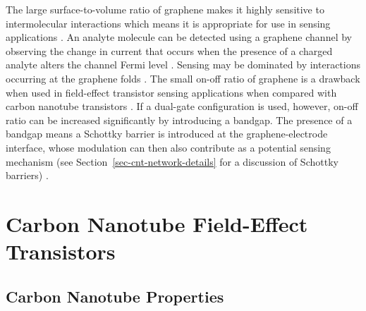 \documentclass[
  a4paper,
]{scrbook}
\begin{document}
The large surface-to-volume ratio of graphene makes it highly sensitive
to intermolecular interactions which means it is appropriate for use in
sensing applications \autocite{Ohno2015,Tran2016}. An analyte molecule
can be detected using a graphene channel by observing the change in
current that occurs when the presence of a charged analyte alters the
channel Fermi level \autocite{Heller2010,Ohno2015}. Sensing may be
dominated by interactions occurring at the graphene folds
\autocite{Zhao2012}. The small on-off ratio of graphene is a drawback
when used in field-effect transistor sensing applications when compared
with carbon nanotube transistors \autocite{Novoselov2004}. If a
dual-gate configuration is used, however, on-off ratio can be increased
significantly by introducing a bandgap. The presence of a bandgap means
a Schottky barrier is introduced at the graphene-electrode interface,
whose modulation can then also contribute as a potential sensing
mechanism (see Section~\ref{sec-cnt-network-details} for a discussion of
Schottky barriers) \autocite{Xia2010}.

\hypertarget{carbon-nanotube-field-effect-transistors}{%
\section{Carbon Nanotube Field-Effect
Transistors}\label{carbon-nanotube-field-effect-transistors}}

\hypertarget{sec-carbon-nanotubes}{%
\subsection{Carbon Nanotube Properties}\label{sec-carbon-nanotubes}}
\end{document}
